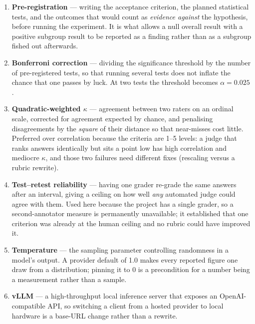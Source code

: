 \begin{enumerate}[label=\arabic*.]
        call. Reported with its definitional overlap stated: it counts papers
        \emph{reached} while the headline metric counts papers \emph{cited}, so
        the two share a numerator term and part of their correlation is built
        in.
  \item \textbf{Pre-registration} --- writing the acceptance criterion, the
        planned statistical tests, and the outcomes that would count as
        \emph{evidence against} the hypothesis, before running the experiment.
        It is what allows a null overall result with a positive subgroup result
        to be reported as a finding rather than as a subgroup fished out
        afterwards.
  \item \textbf{Bonferroni correction} --- dividing the significance threshold
        by the number of pre-registered tests, so that running several tests
        does not inflate the chance that one passes by luck. At two tests the
        threshold becomes $\alpha = 0.025$.
  \item \textbf{Quadratic-weighted $\kappa$} --- agreement between two raters
        on an ordinal scale, corrected for agreement expected by chance, and
        penalising disagreements by the \emph{square} of their distance so that
        near-misses cost little. Preferred over correlation because the criteria
        are 1--5 levels: a judge that ranks answers identically but sits a point
        low has high correlation and mediocre $\kappa$, and those two failures
        need different fixes (rescaling versus a rubric rewrite).
  \item \textbf{Test--retest reliability} --- having one grader re-grade the
        same answers after an interval, giving a ceiling on how well \emph{any}
        automated judge could agree with them. Used here because the project has
        a single grader, so a second-annotator measure is permanently
        unavailable; it established that one criterion was already at the human
        ceiling and no rubric could have improved it.
  \item \textbf{Temperature} --- the sampling parameter controlling randomness
        in a model's output. A provider default of 1.0 makes every reported
        figure one draw from a distribution; pinning it to 0 is a precondition
        for a number being a measurement rather than a sample.
  \item \textbf{vLLM} --- a high-throughput local inference server that exposes
        an OpenAI-compatible API, so switching a client from a hosted provider
        to local hardware is a base-URL change rather than a rewrite.
\end{enumerate}

